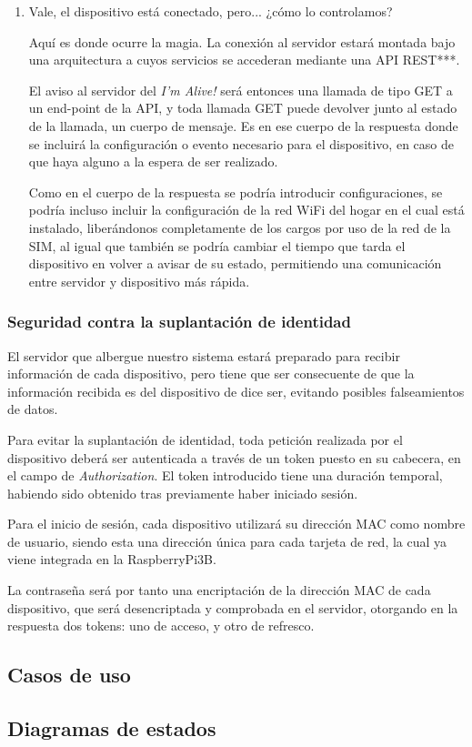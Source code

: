 \begin{enumerate}
    \item Vale, el dispositivo está conectado, pero... ¿cómo lo controlamos?
    
    Aquí es donde ocurre la magia. La conexión al servidor estará montada bajo una arquitectura a cuyos servicios se accederan mediante una API REST***.
    
    El aviso al servidor del \textit{I'm Alive!} será entonces una llamada de tipo GET a un end-point de la API, y toda llamada GET puede devolver junto al estado de la llamada, un cuerpo de mensaje.
    Es en ese cuerpo de la respuesta donde se incluirá la configuración o evento necesario para el dispositivo, en caso de que haya alguno a la espera de ser realizado.
    
    Como en el cuerpo de la respuesta se podría introducir configuraciones, se podría incluso incluir la configuración de la red WiFi del hogar en el cual está instalado, liberándonos completamente de los cargos por uso de la red de la SIM, al igual que también se podría cambiar el tiempo que tarda el dispositivo en volver a avisar de su estado, permitiendo una comunicación entre servidor y dispositivo más rápida.
    
\end{enumerate}

    \subsubsection{Seguridad contra la suplantación de identidad}

    El servidor que albergue nuestro sistema estará preparado para recibir información de cada dispositivo, pero tiene que ser consecuente de que la información recibida es del dispositivo de dice ser, evitando posibles falseamientos de datos.
    
    Para evitar la suplantación de identidad, toda petición realizada por el dispositivo deberá ser autenticada a través de un token puesto en su cabecera, en el campo de \textit{Authorization}. El token introducido tiene una duración temporal, habiendo sido obtenido tras previamente haber iniciado sesión.
    
    Para el inicio de sesión, cada dispositivo utilizará su dirección MAC como nombre de usuario, siendo esta una dirección única para cada tarjeta de red, la cual ya viene integrada en la RaspberryPi3B.
    
    La contraseña será por tanto una encriptación de la dirección MAC de cada dispositivo, que será desencriptada y comprobada en el servidor, otorgando en la respuesta dos tokens: uno de acceso, y otro de refresco.

\subsection{Casos de uso}

\subsection{Diagramas de estados}